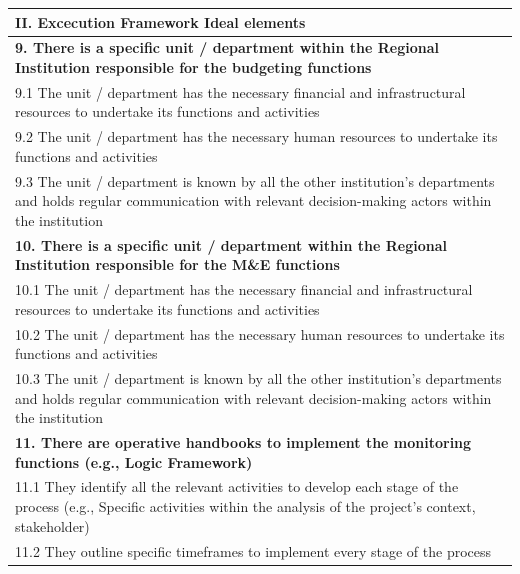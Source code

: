 \documentclass[
  10pt,
]{book}
\begin{document}
\begin{table}
\centering
\begin{tabular}[t]{l}
\hline
II. Excecution Framework Ideal elements\\
\hline
\multicolumn{1}{l}{\textbf{9. There is a specific unit / department within the Regional Institution responsible for the budgeting functions}}\\
\hline
\hspace{1em}9.1 The unit / department has the necessary financial and infrastructural resources to undertake its functions and activities\\
\hline
\hspace{1em}9.2 The unit / department has the necessary human resources to undertake its functions and activities\\
\hline
\hspace{1em}9.3 The unit / department is known by all the other institution's departments and holds regular communication with relevant decision-making actors within the institution\\
\hline
\multicolumn{1}{l}{\textbf{10. There is a specific unit / department within the Regional Institution responsible for the M\&E functions}}\\
\hline
\hspace{1em}10.1 The unit / department has the necessary financial and infrastructural resources to undertake its functions and activities\\
\hline
\hspace{1em}10.2 The unit / department has the necessary human resources to undertake its functions and activities\\
\hline
\hspace{1em}10.3 The unit / department is known by all the other institution's departments and holds regular communication with relevant decision-making actors within the institution\\
\hline
\multicolumn{1}{l}{\textbf{11. There are operative handbooks to implement the monitoring functions (e.g., Logic Framework)}}\\
\hline
\hspace{1em}\hspace{1em}11.1 They identify all the relevant activities to develop each stage of the process (e.g., Specific activities within the analysis of the project's context, stakeholder)\\
\hline
\hspace{1em}\hspace{1em}11.2 They outline specific timeframes to implement every stage of the process\\

\end{tabular}
\end{table}
\end{document}
